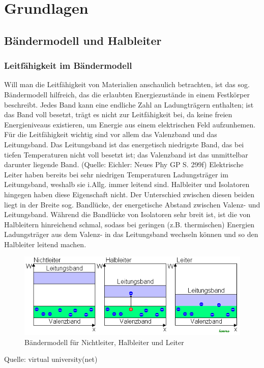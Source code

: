 
\section{Grundlagen}
\subsection{Bändermodell und Halbleiter}
\subsubsection{Leitfähigkeit im Bändermodell}
Will man die Leitfähigkeit von Materialien anschaulich betrachten, ist das sog. Bändermodell hilfreich, das die erlaubten Energiezustände in einem Festkörper beschreibt. Jedes Band kann eine endliche Zahl an Ladungträgern enthalten; ist das Band voll besetzt, trägt es nicht zur Leitfähigkeit bei, da keine freien Energieniveaus existieren, um Energie aus einem elektrischen Feld aufzunhemen. Für die Leitfähigkeit wichtig sind vor allem das Valenzband und das Leitungsband. Das Leitungsband ist das energetisch niedrigste Band, das bei tiefen Temperaturen nicht voll besetzt ist; das Valenzband ist das unmittelbar darunter liegende Band. (Quelle: Eichler: Neues Phy GP S. 299f)
Elektrische Leiter haben bereits bei sehr niedrigen Temperaturen Ladungsträger im Leitungsband, weshalb sie i.Allg. immer leitend sind. Halbleiter und Isolatoren hingegen haben diese Eigenschaft nicht. Der Unterschied zwischen diesen beiden liegt in der Breite sog. Bandlücke, der energetische Abstand zwischen Valenz- und Leitungsband. Während die Bandlücke von Isolatoren sehr breit ist, ist die von Halbleitern hinreichend schmal, sodass bei geringen (z.B. thermischen) Energien Ladungsträger aus dem Valenz- in das Leitungsband wechseln können und so den Halbleiter leitend machen. \\
\begin{figure}[h]
    \centering
    \includegraphics[scale=0.75]{Bilder/Baendermodell.png}
    \caption{Bändermodell für Nichtleiter, Halbleiter und Leiter}
\end{figure}
Quelle: virtual university(net)

